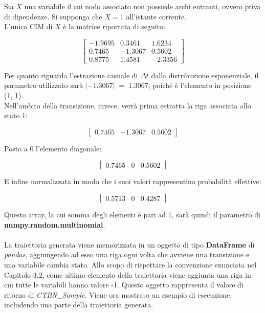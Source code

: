   \begin{exmp}
    Sia $X$ una variabile il cui nodo associato non possiede archi entranti, ovvero priva di dipendenze.
    Si supponga che $X = 1$ all'istante corrente.\\
    L'unica CIM di $X$ è la matrice riportata di seguito:

    \[
      \begin{bmatrix}
        -1.9695 & 0.3461 & 1.6234\\
        0.7465 & -1.3067 & 0.5602\\
        0.8775 & 1.4581 & -2.3356
      \end{bmatrix} 
    \]

    Per quanto riguarda l'estrazione casuale di $\Delta t$ dalla distribuzione esponenziale,
    il parametro utilizzato sarà $\lvert -1.3067 \lvert \; = \; 1.3067$, poiché è l'elemento in posizione (1, 1).\\
    Nell'ambito della transizione, invece, verrà prima estratta la riga associata allo stato 1:
  
    \[
      \begin{bmatrix}
        0.7465 & -1.3067 & 0.5602
      \end{bmatrix} 
    \]

    Posto a 0 l'elemento diagonale:

    \[
      \begin{bmatrix}
        0.7465 & 0 & 0.5602
      \end{bmatrix} 
    \]

    E infine normalizzata in modo che i suoi valori rappresentino probabilità effettive:

    \[
      \begin{bmatrix}
        0.5713 & 0 & 0.4287
      \end{bmatrix} 
    \]

    Questo array, la cui somma degli elementi è pari ad 1, sarà quindi il parametro di
    \textbf{numpy.random.multinomial}.
  \end{exmp}

  \paragraph{}
  La traiettoria generata viene memorizzata in un oggetto di tipo \textbf{DataFrame} di \textit{pandas},
  aggiungendo ad esso una riga ogni volta che avviene una transizione e una variabile cambia stato.
  Allo scopo di rispettare la convenzione enunciata nel Capitolo 3.2, come ultimo elemento della traiettoria
  viene aggiunta una riga in cui tutte le variabili hanno valore -1.
  Questo oggetto rappresenta il valore di ritorno di \textit{CTBN\_Sample}.
  Viene ora mostrato un esempio di esecuzione, includendo una parte della traiettoria generata.

